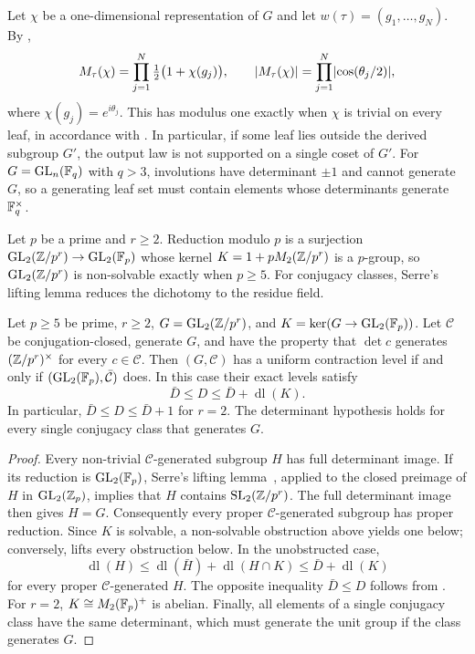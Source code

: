 \begin{remark}
\label{rem:abelian}
Let $\chi$ be a one-dimensional representation of $G$ and let
$w(\tau)=(g_1,\ldots,g_N)$. By ,
\[
 M_\tau(\chi)=\prod_{j=1}^N\tfrac12\bigl(1+\chi(g_j)\bigr),
 \qquad
 \lvert M_\tau(\chi) \rvert=\prod_{j=1}^N\lvert \cos(\theta_j/2) \rvert,
\]
where $\chi(g_j)=e^{i\theta_j}$. This has modulus one exactly when
$\chi$ is trivial on every leaf, in accordance with . In
particular, if some leaf lies outside the derived subgroup $G'$, the
output law is not supported on a single coset of $G'$. For $G=\operatorname{GL}_n(\mathbb{F}_q)$ with $q>3$, involutions have determinant
$\pm1$ and cannot generate $G$, so a generating leaf set must contain
elements whose determinants generate $\mathbb{F}_q^\times$.
\end{remark}

Let $p$ be a prime and $r\ge2$. Reduction modulo $p$ is a surjection
$\operatorname{GL}_2(\mathbb{Z}/p^r)\to\operatorname{GL}_2(\mathbb{F}_p)$ whose kernel
$K=1+pM_2(\mathbb{Z}/p^r)$ is a $p$-group, so $\operatorname{GL}_2(\mathbb{Z}/p^r)$ is non-solvable
exactly when $p\ge5$. For conjugacy classes, Serre's lifting lemma
reduces the dichotomy to the residue field.

\begin{proposition}
\label{prop:congruence-class}
Let $p\ge5$ be prime, $r\ge2$, $G=\operatorname{GL}_2(\mathbb{Z}/p^r)$, and
$K=\ker(G\to\operatorname{GL}_2(\mathbb{F}_p))$. Let $\mathcal C$ be conjugation-closed,
generate $G$, and have the property that $\det c$ generates
$(\mathbb{Z}/p^r)^\times$ for every $c\in\mathcal C$.
Then $(G,\mathcal C)$ has a uniform contraction level if and only if
$(\operatorname{GL}_2(\mathbb{F}_p),\bar{\mathcal C})$ does. In this case their exact levels
satisfy
\[
 \bar D\le D\le\bar D+\operatorname{dl}(K).
\]
In particular, $\bar D\le D\le\bar D+1$ for $r=2$.
The determinant hypothesis holds for every single conjugacy class
that generates $G$.
\end{proposition}
\begin{proof}
Every non-trivial $\mathcal C$-generated subgroup $H$ has full
determinant image. If its reduction is $\operatorname{GL}_2(\mathbb{F}_p)$, Serre's lifting
lemma~\cite[Lemma 3.15]{Lombardo2015}, applied to the closed preimage of
$H$ in $\operatorname{GL}_2(\mathbb{Z}_p)$, implies that $H$ contains $\operatorname{SL}_2(\mathbb{Z}/p^r)$.
The full determinant image then gives $H=G$. Consequently every proper
$\mathcal C$-generated subgroup has proper reduction. Since $K$ is
solvable, a non-solvable obstruction above yields one below; conversely,
 lifts every obstruction below.
In the unobstructed case,
\[
 \operatorname{dl}(H)\le
 \operatorname{dl}(\bar H)+\operatorname{dl}(H\cap K)
 \le\bar D+\operatorname{dl}(K)
\]
for every proper $\mathcal C$-generated $H$. The opposite inequality
$\bar D\le D$ follows from .
For $r=2$, $K\cong M_2(\mathbb{F}_p)^+$ is abelian. Finally, all elements of
a single conjugacy class have the same determinant, which must generate
the unit group if the class generates $G$.
\end{proof}

